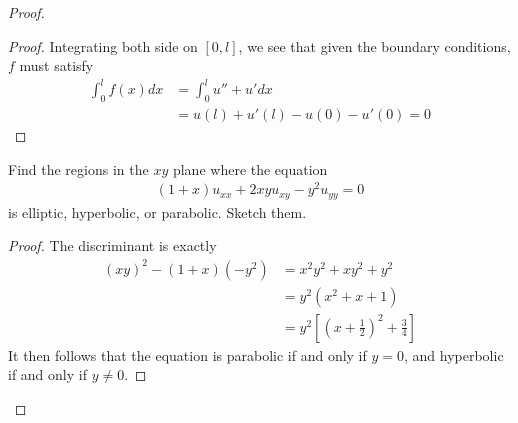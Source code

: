 \documentclass{report}
\begin{document}
\begin{proof}
\begin{proof}
Integrating both side on $[0,l]$, we see that given the boundary conditions, $f$ must satisfy 
\begin{align*}
\int_0^l f(x)dx&=\int_0^l u''+u'dx\\
&=u(l)+u'(l)-u(0)-u'(0)=0
\end{align*}
\end{proof}
\begin{question}{}{}
Find the regions in the $xy$ plane where the equation 
 \begin{align*}
   (1+x)u_{xx}+2xyu_{xy}-y^2u_{yy}=0
\end{align*}
is elliptic, hyperbolic, or parabolic. Sketch them. 
\end{question}
\begin{proof}
The discriminant is exactly 
\begin{align*}
  (xy)^2- (1+x)(-y^2)&=x^2y^2+xy^2+y^2\\
  &=y^2 (x^2+x+1)\\
  &=y^2[(x+\frac{1}{2})^2+ \frac{3}{4}]
\end{align*}
It then follows that the equation is parabolic if and only if $y=0$, and hyperbolic if and only if  $y\neq 0$. 

\end{proof}

\end{proof}
\end{document}
